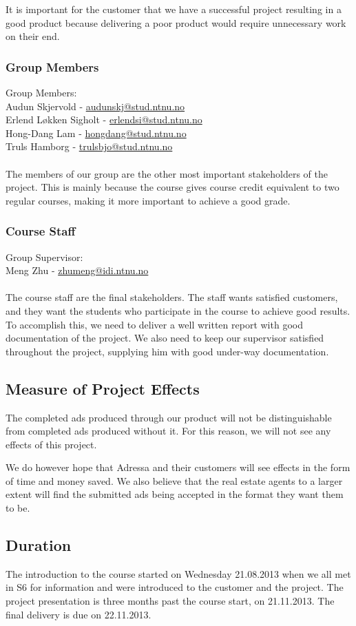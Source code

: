 It is important for the customer that we have a successful project resulting in a good product because delivering a poor product would require unnecessary work on their end.
\subsubsection{Group Members}
Group Members:\\
Audun Skjervold - \href{mailto://audunskj@stud.ntnu.no}{audunskj@stud.ntnu.no}\\
Erlend Løkken Sigholt - \href{mailto://erlendsi@stud.ntnu.no}{erlendsi@stud.ntnu.no}\\
Hong-Dang Lam - \href{mailto://hongdang@stud.ntnu.no}{hongdang@stud.ntnu.no}\\
Truls Hamborg - \href{mailto://trulsbjo@stud.ntnu.no}{trulsbjo@stud.ntnu.no}\\
\\
The members of our group are the other most important stakeholders of the project. This is mainly because the course gives course credit equivalent to two regular courses, making it more important to achieve a good grade.
\subsubsection{Course Staff}
Group Supervisor:\\
Meng Zhu - \href{mailto://zhumeng@idi.ntnu.no}{zhumeng@idi.ntnu.no}\\
\\
The course staff are the final stakeholders. The staff wants satisfied customers, and they want the students who participate in the course to achieve good results. To accomplish this, we need to deliver a well written report with good documentation of the project. We also need to keep our supervisor satisfied throughout the project, supplying him with good under-way documentation.

\subsection{Measure of Project Effects}
The completed ads produced through our product will not be distinguishable from completed ads produced without it. For this reason, we will not see any effects of this project.

We do however hope that Adressa and their customers will see effects in the form of time and money saved. We also believe that the real estate agents to a larger extent will find the submitted ads being accepted in the format they want them to be.

\subsection{Duration}
The introduction to the course started on Wednesday 21.08.2013 when we all met in S6 for information and were introduced to the customer and the project.
The project presentation is three months past the course start, on 21.11.2013.
The final delivery is due on 22.11.2013.
